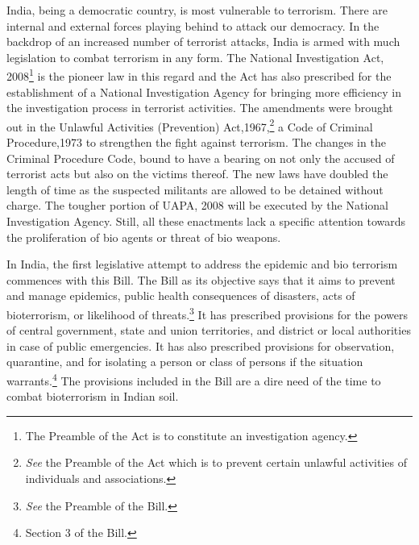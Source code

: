 \begin{multicols}{2}
\noi
India, being a democratic country, is most vulnerable to terrorism. There are internal and
external forces playing behind to attack our democracy. In the backdrop of an increased
number of terrorist attacks, India is armed with much legislation to combat terrorism in any
form. The National Investigation Act, 2008\footnote{The Preamble of the Act is to constitute an investigation agency.} is the pioneer law in this regard and the Act has also prescribed for the establishment of a National Investigation Agency for bringing more efficiency in the investigation process in terrorist activities. The amendments were brought
out in the Unlawful Activities (Prevention) Act,1967,\footnote{\textit{See} the Preamble of the Act which is to prevent certain unlawful activities of individuals and associations.} a Code of Criminal Procedure,1973 to
strengthen the fight against terrorism. The changes in the Criminal Procedure Code, bound to
have a bearing on not only the accused of terrorist acts but also on the victims thereof. The
new laws have doubled the length of time as the suspected militants are allowed to be
detained without charge. The tougher portion of UAPA, 2008 will be executed by the
National Investigation Agency. Still, all these enactments lack a specific attention towards the
proliferation of bio agents or threat of bio weapons.


\noi
In India, the first legislative attempt to address the epidemic and bio terrorism commences
with this Bill. The Bill as its objective says that it aims to prevent and manage epidemics,
public health consequences of disasters, acts of bioterrorism, or likelihood of threats.\footnote{\textit{See} the Preamble of the Bill.} It has prescribed provisions for the powers of central government, state and union territories, and
district or local authorities in case of public emergencies. It has also prescribed provisions for observation, quarantine, and for isolating a person or class of persons if the situation
warrants.\footnote{Section 3 of the Bill.}  The provisions included in the Bill are a dire need of the time to combat bioterrorism in Indian soil.



\end{multicols}
